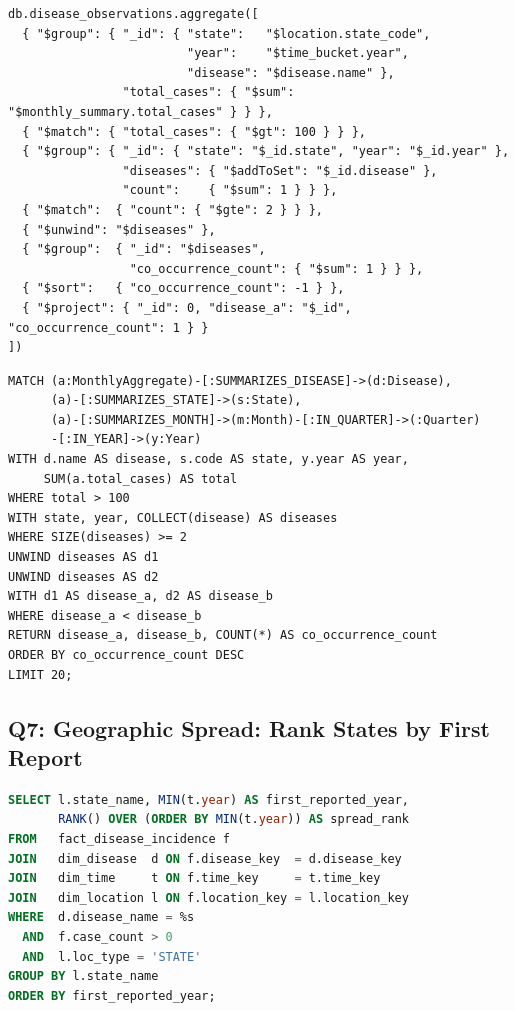 \documentclass[12pt,a4paper]{article}
\begin{document}
\begin{lstlisting}[language={}, caption={Q6: MongoDB. Simplified: per-disease co-occurrence count in state-years that contain at least two diseases. The aggregation framework lacks a native correlation operator.}]
db.disease_observations.aggregate([
  { "$group": { "_id": { "state":   "$location.state_code",
                         "year":    "$time_bucket.year",
                         "disease": "$disease.name" },
                "total_cases": { "$sum": "$monthly_summary.total_cases" } } },
  { "$match": { "total_cases": { "$gt": 100 } } },
  { "$group": { "_id": { "state": "$_id.state", "year": "$_id.year" },
                "diseases": { "$addToSet": "$_id.disease" },
                "count":    { "$sum": 1 } } },
  { "$match":  { "count": { "$gte": 2 } } },
  { "$unwind": "$diseases" },
  { "$group":  { "_id": "$diseases",
                 "co_occurrence_count": { "$sum": 1 } } },
  { "$sort":   { "co_occurrence_count": -1 } },
  { "$project": { "_id": 0, "disease_a": "$_id", "co_occurrence_count": 1 } }
])
\end{lstlisting}

\begin{lstlisting}[language=cypher, caption={Q6: Neo4j. Pair enumeration via double \texttt{UNWIND} over the collected disease list.}]
MATCH (a:MonthlyAggregate)-[:SUMMARIZES_DISEASE]->(d:Disease),
      (a)-[:SUMMARIZES_STATE]->(s:State),
      (a)-[:SUMMARIZES_MONTH]->(m:Month)-[:IN_QUARTER]->(:Quarter)
      -[:IN_YEAR]->(y:Year)
WITH d.name AS disease, s.code AS state, y.year AS year,
     SUM(a.total_cases) AS total
WHERE total > 100
WITH state, year, COLLECT(disease) AS diseases
WHERE SIZE(diseases) >= 2
UNWIND diseases AS d1
UNWIND diseases AS d2
WITH d1 AS disease_a, d2 AS disease_b
WHERE disease_a < disease_b
RETURN disease_a, disease_b, COUNT(*) AS co_occurrence_count
ORDER BY co_occurrence_count DESC
LIMIT 20;
\end{lstlisting}


\subsection*{Q7: Geographic Spread: Rank States by First Report}

\begin{lstlisting}[language=SQL, caption={Q7: PostgreSQL.}]
SELECT l.state_name, MIN(t.year) AS first_reported_year,
       RANK() OVER (ORDER BY MIN(t.year)) AS spread_rank
FROM   fact_disease_incidence f
JOIN   dim_disease  d ON f.disease_key  = d.disease_key
JOIN   dim_time     t ON f.time_key     = t.time_key
JOIN   dim_location l ON f.location_key = l.location_key
WHERE  d.disease_name = %s
  AND  f.case_count > 0
  AND  l.loc_type = 'STATE'
GROUP BY l.state_name
ORDER BY first_reported_year;
\end{lstlisting}
\end{document}
